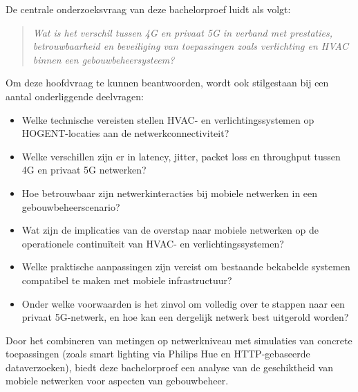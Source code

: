 De centrale onderzoeksvraag van deze bachelorproef luidt als volgt:

\begin{quote}
    \textit{Wat is het verschil tussen 4G en privaat 5G in verband met prestaties, betrouwbaarheid en beveiliging van toepassingen zoals verlichting en HVAC binnen een gebouwbeheersysteem?}
\end{quote}

Om deze hoofdvraag te kunnen beantwoorden, wordt ook stilgestaan bij een aantal onderliggende deelvragen:

\begin{itemize}
    \item Welke technische vereisten stellen HVAC- en verlichtingssystemen op HOGENT-locaties aan de netwerkconnectiviteit?
    \item Welke verschillen zijn er in latency, jitter, packet loss en throughput tussen 4G en privaat 5G netwerken?
    \item Hoe betrouwbaar zijn netwerkinteracties bij mobiele netwerken in een gebouwbeheerscenario?
    \item Wat zijn de implicaties van de overstap naar mobiele netwerken op de operationele continuïteit van HVAC- en verlichtingssystemen?
    \item Welke praktische aanpassingen zijn vereist om bestaande bekabelde systemen compatibel te maken met mobiele infrastructuur?
    \item Onder welke voorwaarden is het zinvol om volledig over te stappen naar een privaat 5G-netwerk, en hoe kan een dergelijk netwerk best uitgerold worden?
\end{itemize}

Door het combineren van metingen op netwerkniveau met simulaties van concrete toepassingen (zoals smart lighting via Philips Hue en HTTP-gebaseerde dataverzoeken), biedt deze bachelorproef een  analyse van de geschiktheid van mobiele netwerken voor aspecten van gebouwbeheer.

